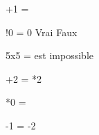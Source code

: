 \documentclass[a4paper, 11pt]{article}
\begin{document}
	\begin{qcm}
	
		+1 =

		\question !0 = 0
			\reponse Vrai
			\reponsejuste Faux

		\question 5x5 =
			\reponse est impossible

		+2 =
			*2

		*0 =

		-1 =
			-2
		
		\end{qcm}	
\end{document}
